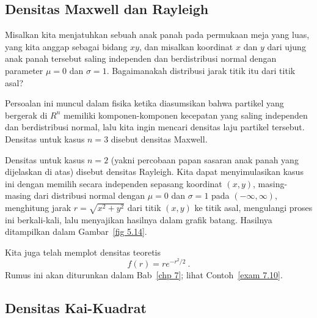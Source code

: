 \subsection*{Densitas Maxwell dan Rayleigh}

\begin{example}\label{exam 5.19} Misalkan kita menjatuhkan sebuah anak panah pada
permukaan meja yang luas, yang kita anggap sebagai bidang $x$$y$, dan misalkan
koordinat $x$ dan $y$ dari ujung anak panah tersebut saling independen dan
berdistribusi normal dengan parameter $\mu = 0$ dan $\sigma = 1$.  Bagaimanakah
distribusi jarak titik itu dari titik asal?
\par
Persoalan ini muncul dalam fisika ketika diasumsikan bahwa partikel yang bergerak di
$R^n$ memiliki komponen-komponen kecepatan yang saling independen dan berdistribusi
normal, lalu kita ingin mencari densitas laju partikel tersebut.  Densitas untuk kasus
$n = 3$ disebut densitas Maxwell.
\par
Densitas untuk kasus $n = 2$ (yakni percobaan papan sasaran anak panah yang dijelaskan
di atas) disebut densitas Rayleigh.  Kita dapat menyimulasikan kasus ini dengan memilih
secara independen sepasang koordinat $(x,y)$, masing-masing dari distribusi normal
dengan $\mu = 0$ dan $\sigma = 1$ pada $(-\infty,\infty)$, menghitung jarak
$r = \sqrt{x^2 + y^2}$ dari titik $(x,y)$ ke titik asal, mengulangi proses ini
berkali-kali, lalu menyajikan hasilnya dalam grafik batang.  Hasilnya ditampilkan
dalam Gambar~\ref{fig 5.14}.


Kita juga telah memplot densitas teoretis
$$ f(r) = re^{-r^2/2}\ .
$$
Rumus ini akan diturunkan dalam Bab~\ref{chp 7}; lihat Contoh~\ref{exam 7.10}.
\end{example}

\subsection*{Densitas Kai-Kuadrat}

